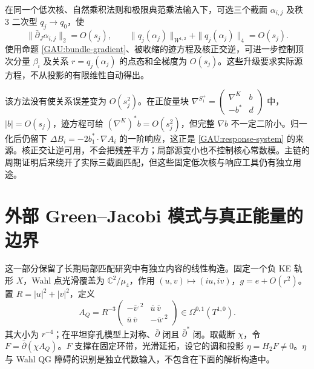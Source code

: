 \documentclass[UTF8,fontset=fandol,zihao=-4,oneside,openany]{ctexbook}
\theoremstyle{cjkplain}
\numberwithin{equation}{chapter}
\begin{document}
在同一个低次核、自然乘积法则和极限典范乘法输入下，可选三个截面 $\alpha_{i,j}$ 及秩 $3$ 二次型 $q_j\to q_0$，使
\begin{equation}\label{GAU:approximate-product}
\|\bar\partial_J\alpha_{i,j}\|_2=O(s_j),\qquad
\|q_j(\alpha_j)\|_{W^{1,2}}+\|q_j(\alpha_j)\|_4=O(s_j).
\end{equation}
使用命题 \ref{GAU:bundle-gradient}、被收缩的迹方程及核正交逆，可进一步控制顶次分量 $\beta_i$ 及关系 $r=q_j(\alpha_j)$ 的点态和全梯度为 $O(s_j)$。这些升级要求实际源方程，不从投影的有限维性自动得出。

该方法没有使关系误差变为 $O(s_j^2)$。在正旋量块
$\nabla^{S_1^+}=\left(\begin{smallmatrix}\nabla^K&b\\-b^*&d\end{smallmatrix}\right)$
中，$|b|=O(s_j)$，迹方程可给 $(\nabla^K)^*b=O(s_j^2)$，但完整 $\nabla b$ 不一定二阶小。归一化后仍留下
$\Delta B_i=-2b_1^*\!\cdot\nabla A_i$ 的一阶响应，这正是 \eqref{GAU:response-system} 的来源。核正交让逆可用，不会把残差平方；局部源变小也不控制核心常数模。主链的周期证明后来绕开了实际三截面匹配，但这些固定低次核与响应工具仍有独立用途。

\section{外部 Green--Jacobi 模式与真正能量的边界}
\label{GAU:Green}

这一部分保留了长期局部匹配研究中有独立内容的线性构造。固定一个负 KE 轨形 $X$，Wahl 点光滑覆盖为 $\mathbb C^2/\mu_4$，作用 $(u,v)\mapsto(iu,iv)$，$g=e+O(r^2)$。置 $R=|u|^2+|v|^2$，定义
\begin{equation}\label{GAU:AQ}
A_Q=R^{-3}\begin{pmatrix}-\overline v^{,2}&\overline u\,\overline v\\
\overline u\,\overline v&-\overline u^{,2}\end{pmatrix}
\in\Omega^{0,1}(T^{1,0}).
\end{equation}
其大小为 $r^{-4}$；在平坦穿孔模型上对称、$\bar\partial$ 闭且 $\bar\partial^*$ 闭。取截断 $\chi$，令 $F=\bar\partial(\chi A_Q)$。$F$ 支撑在固定环带，光滑延拓，设它的调和投影 $\eta=H_2F\ne0$。$\eta$ 与 Wahl QG 障碍的识别是独立代数输入，不包含在下面的解析构造中。
\end{document}
